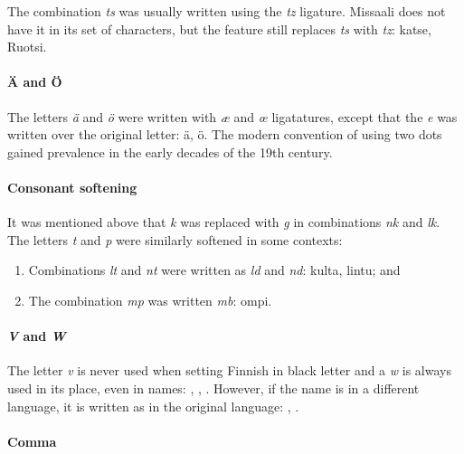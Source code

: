 \documentclass[a4paper, 12pt]{article}
\begin{document}
The combination \emph{ts} was usually written using the \emph{tz}
ligature. Missaali does not have it in its set of characters, but the
feature still replaces \emph{ts} with \emph{tz}:
{ katse}, { Ruotsi}.

\paragraph{Ä and Ö} The letters \emph{ä} and \emph{ö} were written
with \emph{æ} and \emph{œ} ligatatures, except that the \emph{e} was
written over the original letter: {ä},
{ö}. The modern convention of using two dots
gained prevalence in the early decades of the 19th century.
 

\paragraph{Consonant softening} It was mentioned above that \emph{k}
was replaced with \emph{g} in combinations \emph{nk} and \emph{lk}.
The letters \emph{t} and \emph{p} were similarly softened in some
contexts:

\begin{enumerate}
\item Combinations \emph{lt} and \emph{nt} were written as \emph{ld}
  and \emph{nd}: { kulta},
{ lintu}; and 

\item The combination \emph{mp} was written \emph{mb}:
  { ompi}.

\end{enumerate}

\paragraph{\emph{V} and \emph{W}} The letter \emph{v} is never used
when setting Finnish in black letter and a \emph{w} is always used in
its place, even in names: {\MsOldFinnishStyle {}},
{\MsOldFinnishStyle {}},
{\MsOldFinnishStyle{}}. However, if the name is in a
different language, it is written as in the original language:
, .

\paragraph{Comma}
\end{document}

